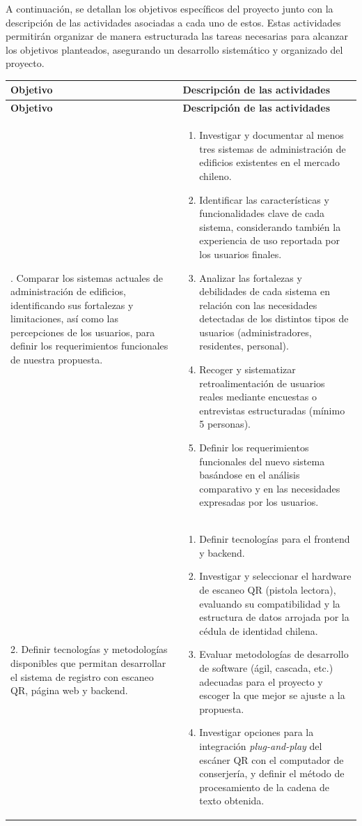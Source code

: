A continuación, se detallan los objetivos específicos del proyecto junto con  la descripción de las actividades asociadas a cada uno de estos. Estas actividades permitirán organizar de manera estructurada las tareas necesarias para alcanzar los objetivos planteados, asegurando un desarrollo sistemático y organizado del proyecto.
\newpage
\begin{longtable}{|p{}|p{}|}
\hline
\textbf{Objetivo} & \textbf{Descripción de las actividades} \\
\hline
\endfirsthead

\hline
\textbf{Objetivo} & \textbf{Descripción de las actividades} \\
\hline
\endhead

\hline
\endfoot

\hline
1. Comparar los sistemas actuales de administración de edificios, identificando sus fortalezas y limitaciones, así como las percepciones de los usuarios, para definir los requerimientos funcionales de nuestra propuesta. &
\begin{enumerate}
    \item Investigar y documentar al menos tres sistemas de administración de edificios existentes en el mercado chileno.
    \item Identificar las características y funcionalidades clave de cada sistema, considerando también la experiencia de uso reportada por los usuarios finales.
    \item Analizar las fortalezas y debilidades de cada sistema en relación con las necesidades detectadas de los distintos tipos de usuarios (administradores, residentes, personal).
    \item Recoger y sistematizar retroalimentación de usuarios reales mediante encuestas o entrevistas estructuradas (mínimo 5 personas).
    \item Definir los requerimientos funcionales del nuevo sistema basándose en el análisis comparativo y en las necesidades expresadas por los usuarios.
\end{enumerate}
\\ \hline

2. Definir tecnologías y metodologías disponibles que permitan desarrollar el sistema de registro con escaneo QR, página web y backend. &
\begin{enumerate}
    \item Definir tecnologías para el frontend y backend.
    \item Investigar y seleccionar el hardware de escaneo QR (pistola lectora), evaluando su compatibilidad  y la estructura de datos arrojada por la cédula de identidad chilena.
    \item Evaluar metodologías de desarrollo de software (ágil, cascada, etc.) adecuadas para el proyecto y escoger la que mejor se ajuste a la propuesta.
    \item Investigar opciones para la integración \textit{plug-and-play} del escáner QR con el computador de conserjería, y definir el método de procesamiento de la cadena de texto obtenida.
\end{enumerate}
\\ \hline


\end{longtable}
